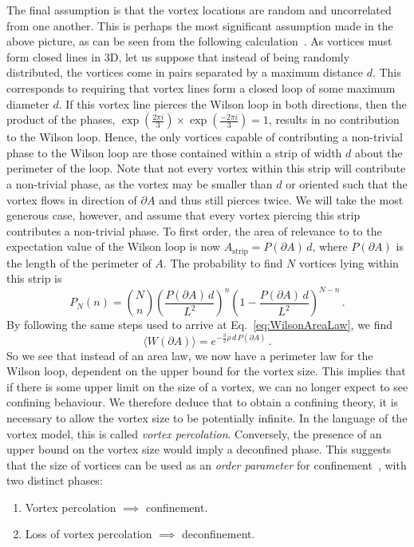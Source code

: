 The final assumption is that the vortex locations are random and uncorrelated from one another. This is perhaps the most significant assumption made in the above picture, as can be seen from the following calculation~\cite{Engelhardt:1999fd}. As vortices must form closed lines in 3D, let us suppose that instead of being randomly distributed, the vortices come in pairs separated by a maximum distance $d$. This corresponds to requiring that vortex lines form a closed loop of some maximum diameter $d$. If this vortex line pierces the Wilson loop in both directions, then the product of the phases, $\exp\left(\frac{2\pi i}{3}\right)\times \exp\left(\frac{-2\pi i}{3}\right) = 1$, results in no contribution to the Wilson loop. Hence, the only vortices capable of contributing a non-trivial phase to the Wilson loop are those contained within a strip of width $d$ about the perimeter of the loop. Note that not every vortex within this strip will contribute a non-trivial phase, as the vortex may be smaller than $d$ or oriented such that the vortex flows in direction of $\partial A$ and thus still pierces twice. We will take the most generous case, however, and assume that every vortex piercing this strip contributes a non-trivial phase. To first order, the area of relevance to to the expectation value of the Wilson loop is now $A_\text{strip}=P(\partial A)\, d$, where $P(\partial A)$ is the length of the perimeter of $A$. The probability to find $N$ vortices lying within this strip is 
%
\begin{equation}
P_N(n) = \binom{N}{n} \left(\frac{P(\partial A)\, d}{L^2}\right)^n \left(1-\frac{P(\partial A)\, d}{L^2}\right)^{N-n}\, .
\end{equation}
%
By following the same steps used to arrive at Eq.~\eqref{eq:WilsonAreaLaw}, we find
%
\begin{equation}
\langle W(\partial A)\rangle = e^{-\frac{3}{2}\rho\, d\, P(\partial A)}\, .
\end{equation}
%
So we see that instead of an area law, we now have a perimeter law for the Wilson loop, dependent on the upper bound for the vortex size. This implies that if there is some upper limit on the size of a vortex, we can no longer expect to see confining behaviour. We therefore deduce that to obtain a confining theory, it is necessary to allow the vortex size to be potentially infinite. In the language of the vortex model, this is called \textit{vortex percolation}. Conversely, the presence of an upper bound on the vortex size would imply a deconfined phase. This suggests that the size of vortices can be used as an \textit{order parameter} for confinement~\cite{Langfeld:1998cz}, with two distinct phases:
\begin{enumerate}
\item Vortex percolation $\implies$ confinement.
\item Loss of vortex percolation $\implies$ deconfinement.
\end{enumerate}

